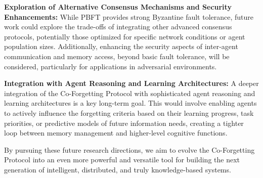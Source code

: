 \documentclass[conference]{IEEEtran}
\begin{document}
\textbf{Exploration of Alternative Consensus Mechanisms and Security Enhancements:} While PBFT provides strong Byzantine fault tolerance, future work could explore the trade-offs of integrating other advanced consensus protocols, potentially those optimized for specific network conditions or agent population sizes. Additionally, enhancing the security aspects of inter-agent communication and memory access, beyond basic fault tolerance, will be considered, particularly for applications in adversarial environments.

\textbf{Integration with Agent Reasoning and Learning Architectures:} A deeper integration of the Co-Forgetting Protocol with sophisticated agent reasoning and learning architectures is a key long-term goal. This would involve enabling agents to actively influence the forgetting criteria based on their learning progress, task priorities, or predictive models of future information needs, creating a tighter loop between memory management and higher-level cognitive functions.

By pursuing these future research directions, we aim to evolve the Co-Forgetting Protocol into an even more powerful and versatile tool for building the next generation of intelligent, distributed, and truly knowledge-based systems.
\end{document}
